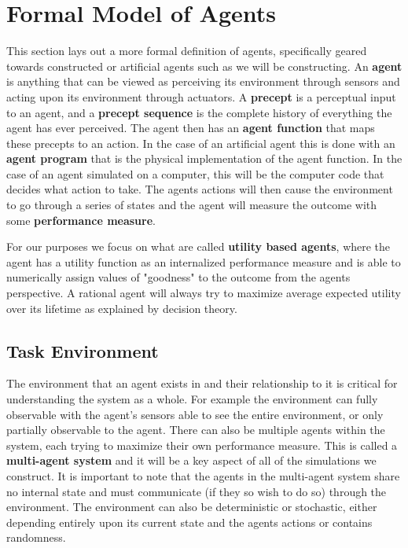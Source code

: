 \documentclass[12pt,twoside]{reedthesis}
\begin{document}
\section{Formal Model of Agents}
This section lays out a more formal definition of agents, specifically geared towards constructed or artificial agents such as we will be constructing. An \textbf{agent} is anything that can be viewed as perceiving its environment through sensors and acting upon its environment through actuators. A \textbf{precept} is a perceptual input to an agent, and a \textbf{precept sequence} is the complete history of everything the agent has ever perceived. The agent then has an \textbf{agent function} that maps these precepts to an action. In the case of an artificial agent this is done with an \textbf{agent program} that is the physical implementation of the agent function. In the case of an agent simulated on a computer, this will be the computer code that decides what action to take. The agents actions will then cause the environment to go through a series of states and the agent will measure the outcome with some \textbf{performance measure}.

%	

For our purposes we focus on what are called \textbf{utility based agents}, where the agent has a utility function as an internalized performance measure and is able to numerically assign values of "goodness" to the outcome from the agents perspective. A rational agent will always try to maximize average expected utility over its lifetime as explained by decision theory.

\subsection{Task Environment}
The environment that an agent exists in and their relationship to it is critical for understanding the system as a whole. For example the environment can fully observable with the agent's sensors able to see the entire environment, or only partially observable to the agent. There can also be multiple agents within the system, each trying to maximize their own performance measure. This is called a \textbf{multi-agent system} and it will be a key aspect of all of the simulations we construct. It is important to note that the agents in the multi-agent system share no internal state and must communicate (if they so wish to do so) through the environment. The environment can also be deterministic or stochastic, either depending entirely upon its current state and the agents actions or contains randomness.
	
\end{document}
